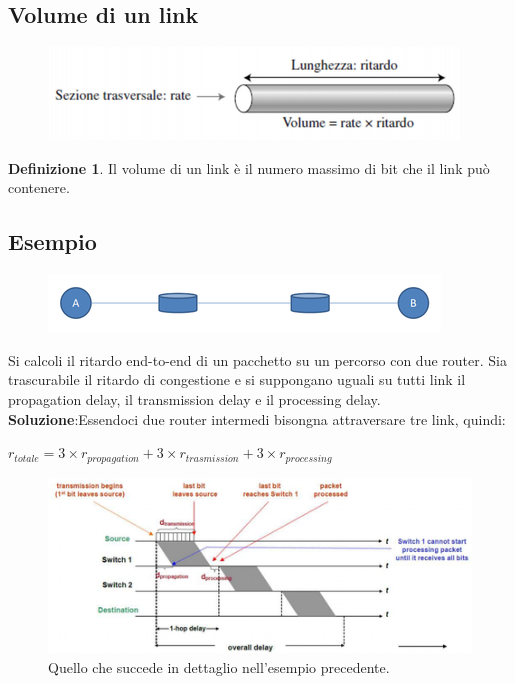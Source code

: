\documentclass[11pt,a4paper]{article}
\theoremstyle{definition}
\newtheorem{definition}{Definizione}[section]
\begin{document}
\subsection{Volume di un link}
\begin{figure}[!h]
	\includegraphics[scale=0.5]{Immagini/Link_Volume.png}
	\centering
\end{figure}
\theoremstyle{definition}
\begin{definition}
	Il volume di un link è il numero massimo di bit che il link può contenere.
\end{definition}
\centerline{}

\subsection{Esempio}
\begin{figure}[!h]
	\includegraphics[scale=0.5]{Immagini/Esempio_ritardi.png}
	\centering
\end{figure}
Si calcoli il ritardo end-to-end di un pacchetto su un percorso con due router. Sia trascurabile il ritardo di congestione e si suppongano uguali su tutti link il propagation delay, il transmission delay e il processing delay.\newline\newline
\textbf{Soluzione}:\newline Essendoci due router intermedi bisongna attraversare tre link, quindi:\newline\newline
\centerline{$r_{totale} = 3\times r_{propagation} + 3\times r_{trasmission} + 3\times r_{processing}$}
\newpage
\begin{figure}[!h]
	\includegraphics[scale=0.82]{Immagini/Soluzione_ritardi.png}
	\centering
	\caption{Quello che succede in dettaglio nell'esempio precedente.}
\end{figure}
\end{document}
